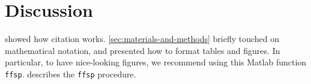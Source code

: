 
\section{Discussion \label{sec:discussion}}
	 showed how citation works.
	\ref{sec:materials-and-methods} briefly touched on mathematical notation, and  presented how to format tables and figures.
	In particular, to have nice-looking figures, we recommend using this Matlab function \texttt{ffsp}.
	 describes the \texttt{ffsp} procedure.
	
